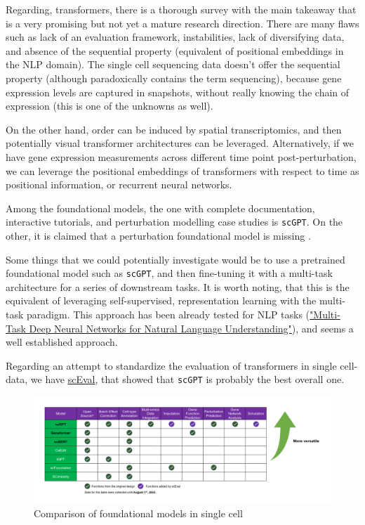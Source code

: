 \documentclass[12pt, a4paper]{article}
\begin{document}
Regarding, transformers, there is a thorough survey \cite{szalataTransformersSinglecellOmics2024} with the main takeaway that is a very promising but not yet a mature research direction. There are many flaws such as lack of an evaluation framework, instabilities, lack of diversifying data, and absence of the sequential property (equivalent of positional embeddings in the NLP domain). The single cell sequencing data doesn't offer the sequential property (although paradoxically contains the term sequencing),  because gene expression levels are captured in snapshots, without really knowing the chain of expression (this is one of the unknowns as well).

On the other hand, order can be induced by spatial transcriptomics, and then potentially visual transformer architectures can be leveraged. Alternatively, if we have gene expression measurements across different time point post-perturbation, we can leverage the positional embeddings of transformers with respect to time as positional information, or recurrent neural networks.

Among the foundational models, the one with complete documentation, interactive tutorials, and perturbation modelling case studies is \verb|scGPT|. On the other, it is claimed that a perturbation foundational model is missing \cite{szalataTransformersSinglecellOmics2024}.

Some things that we could potentially investigate would be to use a pretrained foundational model such as \verb|scGPT|, and then fine-tuning it with a multi-task architecture for a series of downstream tasks. It is worth noting, that this is the equivalent of leveraging self-supervised, representation learning with the multi-task paradigm. This approach has been already tested for NLP tasks (\href{https://arxiv.org/pdf/1901.11504}{"Multi-Task Deep Neural Networks for Natural Language Understanding"}), and seems a well established approach.

Regarding an attempt to standardize the evaluation of transformers in single cell-data, we have \href{https://github.com/HelloWorldLTY/scEval}{scEval}\cite{zhaoEvaluatingUtilitiesLarge2023}, that showed that \verb|scGPT| is probably the best overall one.

\begin{figure}[h!]
  \centering
  \includegraphics[width=\textwidth]{sceval.png}
  \caption{Comparison of foundational models in single cell \cite{zhaoEvaluatingUtilitiesLarge2023}}
\end{figure}
\end{document}

